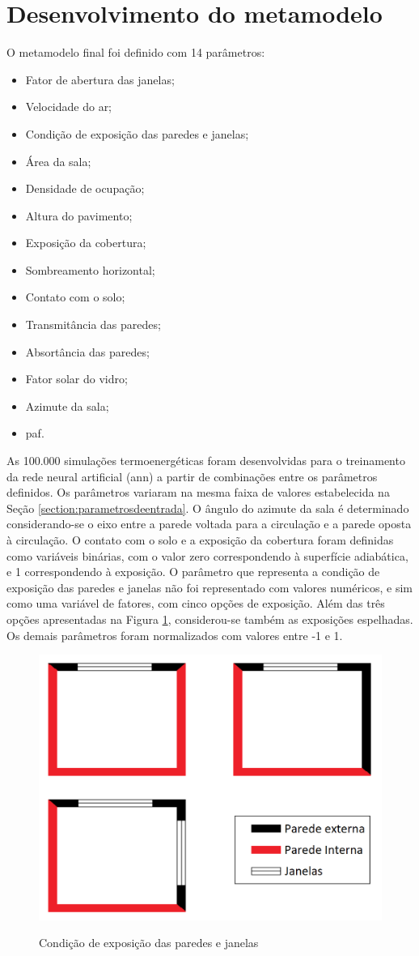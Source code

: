 \section{Desenvolvimento do metamodelo}

O metamodelo final foi definido com 14 parâmetros:
\begin{itemize}
	\item Fator de abertura das janelas;
	\item Velocidade do ar;
	\item Condição de exposição das paredes e janelas;
	\item Área da sala;
	\item Densidade de ocupação;
	\item Altura do pavimento;
	\item Exposição da cobertura;
	\item Sombreamento horizontal;
	\item Contato com o solo;
	\item Transmitância das paredes;
	\item Absortância das paredes;
	\item Fator solar do vidro;
	\item Azimute da sala;
	\item \Acrlong{paf}.
\end{itemize}

As 100.000 simulações termoenergéticas foram desenvolvidas para o treinamento da rede neural artificial (\acrshort{ann}) a partir de combinações entre os parâmetros definidos.
Os parâmetros variaram na mesma faixa de valores estabelecida na Seção \ref{section:parametrosdeentrada}. O ângulo do azimute da sala é determinado considerando-se o eixo entre a parede voltada para a circulação e a parede oposta à circulação.
O contato com o solo e a exposição da cobertura foram definidas como variáveis binárias, com o valor zero correspondendo à superfície adiabática, e 1 correspondendo à exposição.
O parâmetro que representa a condição de exposição das paredes e janelas não foi representado com valores numéricos, e sim como uma variável de fatores, com cinco opções de exposição. Além das três opções apresentadas na Figura \ref{fig:exp_sz}, considerou-se também as exposições espelhadas. 	
Os demais parâmetros foram normalizados com valores entre -1 e 1.

\begin{figure}[h]
	\centering
	\caption{Condição de exposição das paredes e janelas}
	\includegraphics[width=.5\linewidth]{img/wallexposition2.png}
	\label{fig:exp_sz}
\end{figure}

